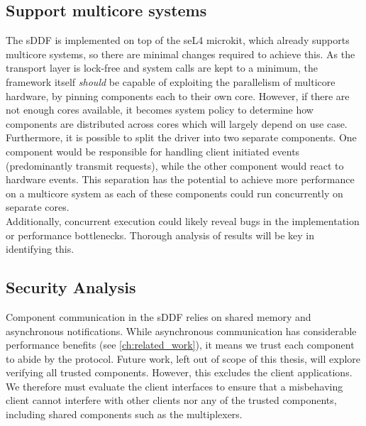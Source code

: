 \subsection{Support multicore systems}\label{s:multicore}
The sDDF is implemented on top of the seL4 microkit, which already supports multicore systems, so there are minimal changes required
to achieve this. As the transport layer is lock-free and system calls are kept to a minimum, the framework itself 
\emph{should} be capable of exploiting the parallelism of multicore hardware, by pinning components each to their 
own core. However, if there are not enough cores available, it becomes system policy to determine how components are distributed
across cores which will largely depend on use case.\\
Furthermore, it is possible to split the driver into two separate components. One component would be responsible for
handling client initiated events (predominantly transmit requests), while the other component would react to 
hardware events. This separation has the potential to achieve more performance on a multicore system as
each of these components could run concurrently on separate cores.\\
Additionally, concurrent execution could likely reveal bugs in the implementation or performance bottlenecks. Thorough 
analysis of results will be key in identifying this.

\subsection{Security Analysis}\label{s:security}
Component communication in the sDDF relies on shared memory and asynchronous notifications. While asynchronous communication
has considerable performance benefits (see \autoref{ch:related_work}), it means we trust each component to abide by the protocol. 
Future work, left out of scope of this thesis, will explore verifying all trusted components. However, this excludes the client
applications. We therefore must evaluate the client interfaces to ensure that a misbehaving client cannot interfere with other clients
nor any of the trusted components, including shared components such as the multiplexers. 


